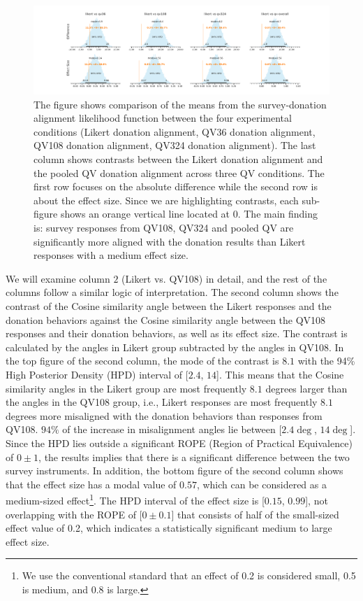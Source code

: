 \begin{figure}[htpb]
  \centering
  \includegraphics[trim= 2in 0in 2in 0in, clip, width=\textwidth, keepaspectratio=true]{"content/image/Votes_vs_Absolute_Donation_StudentT_differences_and_effects.pdf"}
  \caption{
    The figure shows comparison of the means from the survey-donation alignment likelihood function between the four experimental conditions (Likert donation alignment, QV36 donation alignment, QV108 donation alignment, QV324 donation alignment). The last column shows contrasts between the Likert donation alignment and the pooled QV donation alignment across three QV conditions. The first row focuses on the absolute difference while the second row is about the effect size. Since we are highlighting contrasts, each sub-figure shows an orange vertical line located at 0. The main finding is: survey responses from QV108, QV324 and pooled QV are significantly more aligned with the donation results than Likert responses with a medium effect size.
  }
  \label{fig:contrast_exp1}
\end{figure}

We will examine column $2$ (Likert vs. QV108) in detail, and the rest of the columns follow a similar logic of interpretation. The second column shows the contrast of the Cosine similarity angle between the Likert responses and the donation behaviors against the Cosine similarity angle between the QV108 responses and their donation behaviors, as well as its effect size. The contrast is calculated by the angles in Likert group subtracted by the angles in QV108. In the top figure of the second column, the mode of the contrast is $8.1$ with the 94\% High Posterior Density (HPD) interval of [$2.4$, $14$]. This means that the Cosine similarity angles in the Likert group are most frequently $8.1$ degrees larger than the angles in the QV108 group, i.e., Likert responses are most frequently $8.1$ degrees more misaligned with the donation behaviors than responses from QV108. $94\%$ of the increase in misalignment angles lie between [$2.4 \deg$, $14 \deg$]. Since the HPD lies outside a significant ROPE (Region of Practical Equivalence) of $0 \pm 1$, the results implies that there is a significant difference between the two survey instruments. In addition, the bottom figure of the second column shows that the effect size has a modal value of $0.57$, which can be considered as a medium-sized effect\footnote{We use the conventional standard that an effect of 0.2 is considered small, 0.5 is medium, and 0.8 is large.}. The HPD interval of the effect size is [$0.15$, $0.99$], not overlapping with the ROPE of [$0 \pm 0.1$] that consists of half of the small-sized effect value of 0.2, which indicates a statistically significant medium to large effect size.

